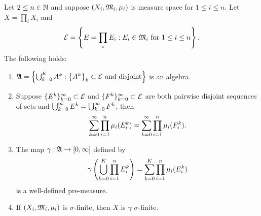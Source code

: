 \documentclass[a4paper]{article}
\begin{document}
\begin{thm}
Let $2 \leq n \in \mathbb{N}$ and suppose $(X_i, \mathfrak{M}_i, \mu_i)$
is measure space for $1 \leq i \leq n$. Let 
$X = \prod_i X_i$ and 
\[
\mathcal{E} = \left\{ E = \prod_i E_i : 
\text{$E_i \in \mathfrak{M}_i$ for $1 \leq i \leq n$} \right\}.
\]
The following holds: 
\begin{enumerate}
\item $\mathfrak{A} = \left\{ \bigcup_{k=0}^K A^k : 
\text{$\left\{ A^k \right\}_k \subset \mathcal{E}$ and disjoint} 
\right\}$ is an algebra.

\item Suppose $\{ E^k \}_{k=0}^\infty \subset \mathcal{E}$ and 
$\{ F^k \}_{k=0}^\infty \subset \mathcal{E}$ are both pairwise disjoint sequences 
of sets and $\bigcup_{k=0}^\infty{E^k} = \bigcup_{k=0}^\infty{F^k}$, then 
\[
\sum_{k=0}^\infty \prod_{i=1}^n \mu_i(E_i^k) = 
\sum_{k=0}^\infty \prod_{i=1}^n \mu_i(F_i^k).
\]

\item The map $\gamma: \mathfrak{A} \to [0, \infty]$ defined by 
\[
\gamma \left( \bigcup_{k=0}^K \prod_{i=1}^n E_i^k \right)
= \sum_{k=0}^K \prod_{i=1}^n \mu_i(E_i^k)
\]
is a well-defined pre-measure.

\item If $(X_i, \mathfrak{M}_i, \mu_i)$ is $\sigma$-finite, then 
$X$ is $\gamma$ $\sigma$-finite.
\end{enumerate}
\end{thm}
\end{document}
